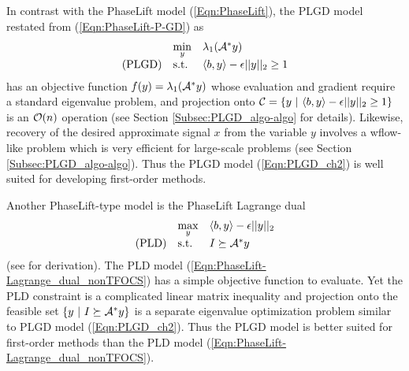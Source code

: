 In contrast with the PhaseLift model (\ref{Eqn:PhaseLift}), the PLGD model restated from (\ref{Eqn:PhaseLift-P-GD}) as
\begin{equation} 			\label{Eqn:PLGD_ch2}
\begin{array}{lll}
	&	\min\limits_{\substack{y}}
		&	\lambda_1({\mathcal A}^* y)		\\
\textnormal{(PLGD)}
	&	\textnormal{s.t.}
		&	\langle b, y \rangle - \epsilon ||y||_2 \geq 1
\end{array}
\end{equation}
has an objective function $f(y) = \lambda_1({\mathcal A}^* y)$ whose evaluation and gradient require a standard eigenvalue problem, and projection onto ${\mathcal C} = \{y \ | \ \langle b, y \rangle - \epsilon ||y||_2 \geq 1\}$ is an ${\mathcal O}(n)$ operation (see Section \ref{Subsec:PLGD_algo-algo} for details).  Likewise, recovery of the desired approximate signal $x$ from the variable $y$ involves a wflow-like problem which is very efficient for large-scale problems (see Section \ref{Subsec:PLGD_algo-algo}).  Thus the PLGD model (\ref{Eqn:PLGD_ch2}) is well suited for developing first-order methods.

Another PhaseLift-type model is the PhaseLift Lagrange dual
\begin{equation} 			\label{Eqn:PhaseLift-Lagrange_dual_nonTFOCS}
\begin{array}{lll}
&	\max\limits_{\substack{y}}
					&	\langle b, y \rangle - \epsilon ||y||_2
						\\
\textnormal{(PLD)}
				&	\textnormal{s.t.}
					&	I \succeq {\mathcal A}^*y
\end{array}
\end{equation}
(see \cite[Chapter 5]{boyd2004convex} for derivation).  The PLD model (\ref{Eqn:PhaseLift-Lagrange_dual_nonTFOCS}) has a simple objective function to evaluate.  Yet the PLD constraint is a complicated linear matrix inequality and projection onto the feasible set $\{ y \ | \ I \succeq {\mathcal A}^*y \}$ is a separate eigenvalue optimization problem similar to PLGD model (\ref{Eqn:PLGD_ch2}).  Thus the PLGD model is better suited for first-order methods than the PLD model (\ref{Eqn:PhaseLift-Lagrange_dual_nonTFOCS}).



